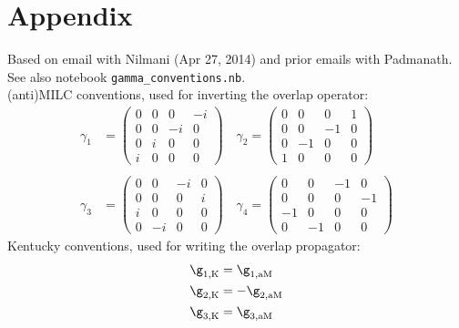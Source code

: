 \documentclass[11pt,a4paper]{article}
\begin{document}
\section{Appendix} 
Based on email with Nilmani (Apr 27, 2014) and prior emails with Padmanath.\\
See also notebook {\tt gamma\_conventions.nb}.\\
(anti)MILC conventions, used for inverting the overlap operator:
\begin{equation}
\begin{split}
\gamma_1 &= 
\begin{pmatrix}
 0 & 0 & 0 & -i \\
 0 & 0 & -i & 0 \\
 0 & i & 0 & 0 \\
 i & 0 & 0 & 0
\end{pmatrix}
\quad
\gamma_2 =
\begin{pmatrix}
 0 & 0 & 0 & 1 \\
 0 & 0 & -1 & 0 \\
 0 & -1 & 0 & 0 \\
 1 & 0 & 0 & 0
\end{pmatrix}
\\ \\
\gamma_3 &=
\begin{pmatrix}
 0 & 0 & -i & 0 \\
 0 & 0 & 0 & i \\
 i & 0 & 0 & 0 \\
 0 & -i & 0 & 0
\end{pmatrix}
\quad
\gamma_4 =
\begin{pmatrix}
 0 & 0 & -1 & 0 \\
 0 & 0 & 0 & -1 \\
 -1 & 0 & 0 & 0 \\
 0 & -1 & 0 & 0
\end{pmatrix}
\end{split}
\end{equation}
Kentucky conventions, used for writing the overlap propagator:\\
\begin{align}
\g_{1,\text{K}} &= \g_{1,\text{aM}} \\
\g_{2,\text{K}} &= - \g_{2,\text{aM}} \\
\g_{3,\text{K}} &= \g_{3,\text{aM}} 
\end{align}
\end{document}
